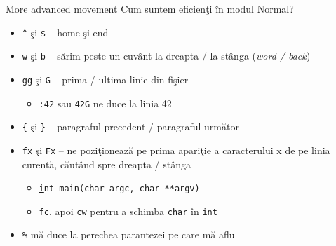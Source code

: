 \documentclass{beamer}
\begin{document}
\begin{frame}{More advanced movement}
Cum suntem eficienţi în modul Normal?
\begin{itemize}
  \item<2-> \texttt{\^} şi \texttt{\$} -- home şi end
  \item<3-> \texttt{w} şi \texttt{b} -- sărim peste un cuvânt la dreapta / la
  stânga (\textit{word / back})
  \item<4-> \texttt{gg} şi \texttt{G} -- prima / ultima linie din fişier
    \begin{itemize}
    \item<5-> \texttt{:42} sau \texttt{42G} ne duce la linia 42
    \end{itemize}
  \item<6-> \texttt{\{} şi \texttt{\}} -- paragraful precedent / paragraful
  următor
  \item<7-> \texttt{fx} şi \texttt{Fx} -- ne poziţionează pe prima apariţie a
  caracterului x de pe linia curentă, căutând spre dreapta / stânga
    \begin{itemize}
    \item<8-> \texttt{\underline{i}nt main(char argc, char **argv)} 
    \item<9-> \texttt{fc}, apoi \texttt{cw} pentru a schimba \texttt{char} în
    \texttt{int}
    \end{itemize}
  \item<10-> \texttt{\%} mă duce la perechea parantezei pe care mă aflu
\end{itemize}
\end{frame}
\end{document}
